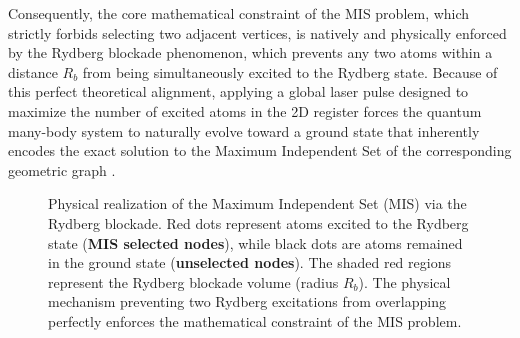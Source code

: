 Consequently, the core mathematical constraint of the MIS problem, which strictly forbids selecting two adjacent vertices, is natively and physically enforced by the Rydberg blockade phenomenon, which prevents any two atoms within a distance $R_b$ from being simultaneously excited to the Rydberg state. 
Because of this perfect theoretical alignment, applying a global laser pulse designed to maximize the number of excited atoms in the 2D register forces the quantum many-body system to naturally evolve toward a ground state that inherently encodes the exact solution to the Maximum Independent Set of the corresponding geometric graph \cite{Henriet2020quantumcomputing}.
\begin{figure}[htbp]
\centering
{}
\caption{Physical realization of the Maximum Independent Set (MIS) via the Rydberg blockade. Red dots represent atoms excited to the Rydberg state (\textbf{MIS selected nodes}), while black dots are atoms remained in the ground state (\textbf{unselected nodes}). 
The shaded red regions represent the Rydberg blockade volume (radius $R_b$). The physical mechanism preventing two Rydberg excitations from overlapping perfectly enforces the mathematical constraint of the MIS problem.}
\label{fig:rydberg_mis}
\end{figure}

